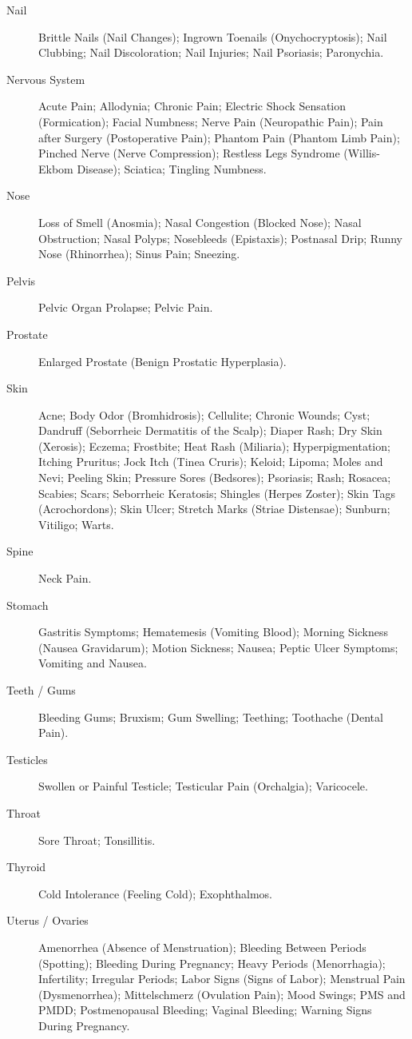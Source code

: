 \begin{description}
  \item[Nail] Brittle Nails (Nail Changes); Ingrown Toenails (Onychocryptosis); Nail Clubbing; Nail Discoloration; Nail Injuries; Nail Psoriasis; Paronychia.
  \item[Nervous System] Acute Pain; Allodynia; Chronic Pain; Electric Shock Sensation (Formication); Facial Numbness; Nerve Pain (Neuropathic Pain); Pain after Surgery (Postoperative Pain); Phantom Pain (Phantom Limb Pain); Pinched Nerve (Nerve Compression); Restless Legs Syndrome (Willis-Ekbom Disease); Sciatica; Tingling Numbness.
  \item[Nose] Loss of Smell (Anosmia); Nasal Congestion (Blocked Nose); Nasal Obstruction; Nasal Polyps; Nosebleeds (Epistaxis); Postnasal Drip; Runny Nose (Rhinorrhea); Sinus Pain; Sneezing.
  \item[Pelvis] Pelvic Organ Prolapse; Pelvic Pain.
  \item[Prostate] Enlarged Prostate (Benign Prostatic Hyperplasia).
  \item[Skin] Acne; Body Odor (Bromhidrosis); Cellulite; Chronic Wounds; Cyst; Dandruff (Seborrheic Dermatitis of the Scalp); Diaper Rash; Dry Skin (Xerosis); Eczema; Frostbite; Heat Rash (Miliaria); Hyperpigmentation; Itching Pruritus; Jock Itch (Tinea Cruris); Keloid; Lipoma; Moles and Nevi; Peeling Skin; Pressure Sores (Bedsores); Psoriasis; Rash; Rosacea; Scabies; Scars; Seborrheic Keratosis; Shingles (Herpes Zoster); Skin Tags (Acrochordons); Skin Ulcer; Stretch Marks (Striae Distensae); Sunburn; Vitiligo; Warts.
  \item[Spine] Neck Pain.
  \item[Stomach] Gastritis Symptoms; Hematemesis (Vomiting Blood); Morning Sickness (Nausea Gravidarum); Motion Sickness; Nausea; Peptic Ulcer Symptoms; Vomiting and Nausea.
  \item[Teeth / Gums] Bleeding Gums; Bruxism; Gum Swelling; Teething; Toothache (Dental Pain).
  \item[Testicles] Swollen or Painful Testicle; Testicular Pain (Orchalgia); Varicocele.
  \item[Throat] Sore Throat; Tonsillitis.
  \item[Thyroid] Cold Intolerance (Feeling Cold); Exophthalmos.
  \item[Uterus / Ovaries] Amenorrhea (Absence of Menstruation); Bleeding Between Periods (Spotting); Bleeding During Pregnancy; Heavy Periods (Menorrhagia); Infertility; Irregular Periods; Labor Signs (Signs of Labor); Menstrual Pain (Dysmenorrhea); Mittelschmerz (Ovulation Pain); Mood Swings; PMS and PMDD; Postmenopausal Bleeding; Vaginal Bleeding; Warning Signs During Pregnancy.

\end{description}
